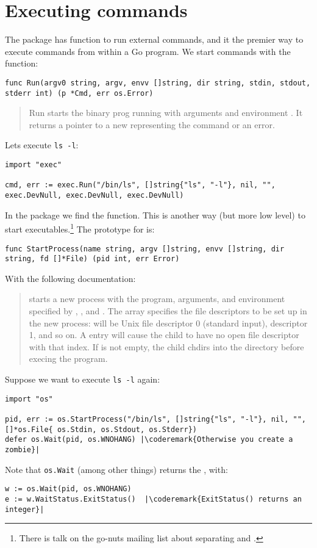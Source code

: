 \section{Executing commands}
The  package has function to run external commands, and it the premier way to
execute commands from within a Go program. We start commands with 
the  function:
\begin{lstlisting}
func Run(argv0 string, argv, envv []string, dir string, stdin, stdout, stderr int) (p *Cmd, err os.Error)
\end{lstlisting}
\begin{quote}
Run starts the binary prog running with
arguments  and environment .
It returns a pointer to a new  representing the command or an error.
\end{quote}
Lets execute \verb|ls -l|:
\begin{lstlisting}
import "exec"

cmd, err := exec.Run("/bin/ls", []string{"ls", "-l"}, nil, "", exec.DevNull, exec.DevNull, exec.DevNull)
\end{lstlisting}
In the  package we find the  function. This
is another way (but more low level) to start executables.\footnote{There is talk on
the go-nuts mailing list about separating  and
.} 
The prototype for  is:
\begin{lstlisting}
func StartProcess(name string, argv []string, envv []string, dir string, fd []*File) (pid int, err Error)
\end{lstlisting}
With the following documentation:
\begin{quote}
 starts a new process with the program, arguments,
and environment specified by , , and . The  array specifies the
file descriptors to be set up in the new process:  will be Unix file
descriptor 0 (standard input),  descriptor 1, and so on.  A  entry
will cause the child to have no open file descriptor with that index.
If  is not empty, the child chdirs into the directory before execing the program.
\end{quote}
Suppose we want to execute \verb|ls -l| again:
\begin{lstlisting}
import "os"

pid, err := os.StartProcess("/bin/ls", []string{"ls", "-l"}, nil, "", []*os.File{ os.Stdin, os.Stdout, os.Stderr})
defer os.Wait(pid, os.WNOHANG) |\coderemark{Otherwise you create a zombie}|
\end{lstlisting}
Note that \lstinline{os.Wait} (among other things) returns the
, with:
\begin{lstlisting}
w := os.Wait(pid, os.WNOHANG)
e := w.WaitStatus.ExitStatus()  |\coderemark{ExitStatus() returns an integer}|
\end{lstlisting}

